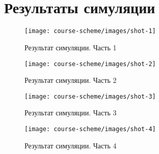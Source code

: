 \fontsize{14}{16pt}\selectfont
\chapter{\\\hspace{-6mm}Результаты симуляции}
\label{cha:appendix2}
\begin{figure}[h!]
	\centering
	\texttt{[image: course-scheme/images/shot-1]}
	\caption{Результат симуляции. Часть 1}
	\label{fig:shot-1}
\end{figure}
\begin{figure}[h!]
	\centering
	\texttt{[image: course-scheme/images/shot-2]}
	\caption{Результат симуляции. Часть 2}
	\label{fig:shot-2}
\end{figure}
\begin{figure}[h!]
	\centering
	\texttt{[image: course-scheme/images/shot-3]}
	\caption{Результат симуляции. Часть 3}
	\label{fig:shot-3}
\end{figure}
\begin{figure}[h!]
	\centering
	\texttt{[image: course-scheme/images/shot-4]}
	\caption{Результат симуляции. Часть 4}
	\label{fig:shot-4}
\end{figure}



